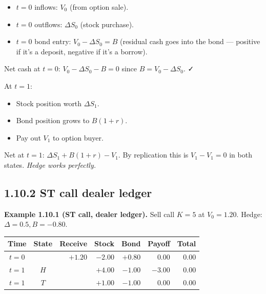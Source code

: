 \documentclass[
  10pt,
  twoside]{book}
\newcounter{none} %
\providecommand{\tightlist}{%
  \setlength{\itemsep}{0pt}\setlength{\parskip}{0pt}}
\begin{document}
\begin{itemize}
\tightlist
\item
  \(t=0\) inflows: \(V_0\) (from option sale).
\item
  \(t=0\) outflows: \(\Delta S_0\) (stock purchase).
\item
  \(t=0\) bond entry: \(V_0 - \Delta S_0 = B\) (residual cash goes into
  the bond --- positive if it's a deposit, negative if it's a borrow).
\end{itemize}

Net cash at \(t=0\): \(V_0 - \Delta S_0 - B = 0\) since
\(B = V_0 - \Delta S_0\). ✓

At \(t=1\):

\begin{itemize}
\tightlist
\item
  Stock position worth \(\Delta S_1\).
\item
  Bond position grows to \(B(1+r)\).
\item
  Pay out \(V_1\) to option buyer.
\end{itemize}

Net at \(t=1\): \(\Delta S_1 + B(1+r) - V_1\). By replication this is
\(V_1 - V_1 = 0\) in both states. \emph{Hedge works perfectly.}

\subsection{1.10.2 ST call dealer ledger}\label{st-call-dealer-ledger}

\textbf{Example 1.10.1 (ST call, dealer ledger).} Sell call \(K=5\) at
\(V_0=1.20\). Hedge: \(\Delta=0.5, B=-0.80\).

{\def\LTcaptype{none} %
\begin{table}[H]
\centering
\begin{tabular}{|c|c|r|r|r|r|r|}
\toprule
Time & State & Receive & Stock & Bond & Payoff & Total \\
\midrule



\(t=0\) & & \(+1.20\) & \(-2.00\) & \(+0.80\) & \(0.00\) &
\(\mathbf{0.00}\) \\
\(t=1\) & \(H\) & & \(+4.00\) & \(-1.00\) & \(-3.00\) &
\(\mathbf{0.00}\) \\
\(t=1\) & \(T\) & & \(+1.00\) & \(-1.00\) & \(0.00\) &
\(\mathbf{0.00}\) \\
\bottomrule
\end{tabular}
\end{table}
}
\end{document}
